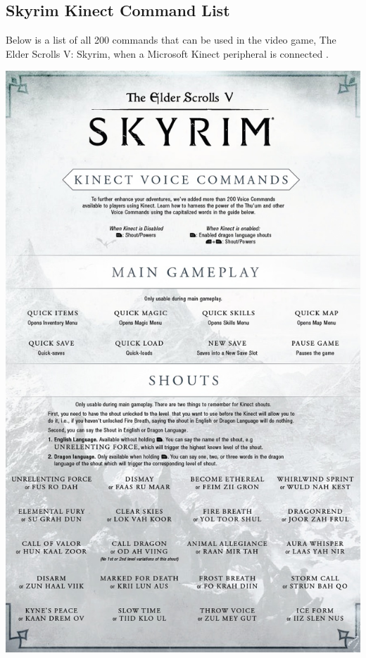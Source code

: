 \documentclass[11pt]{article}
\begin{document}
\newpage
\subsection{Skyrim Kinect Command List}
\label{appendix:skyrim}
Below is a list of all 200 commands that can be used in the video game, The Elder Scrolls V: Skyrim, when a Microsoft Kinect peripheral is connected \cite{RefWorks:24}.

\includegraphics[scale=0.235]{skyrim-1.jpg}
\end{document}
